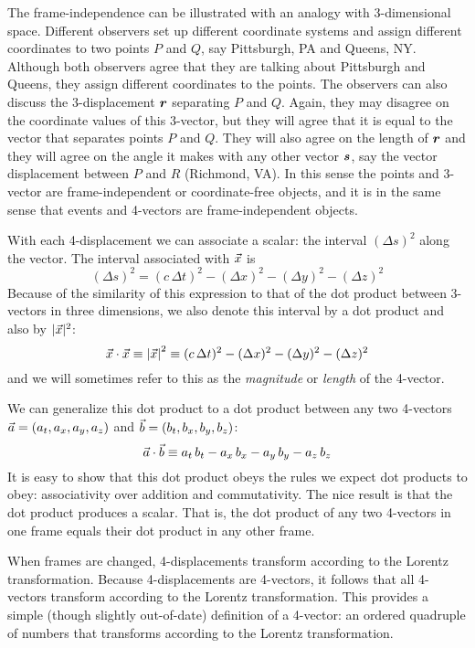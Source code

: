 The frame-independence can be illustrated with an analogy with
3-dimensional space.  Different observers set up different coordinate
systems and assign different coordinates to two points $P$ and $Q$,
say Pittsburgh, PA and Queens, NY.  Although both observers agree that
they are talking about Pittsburgh and Queens, they assign different
coordinates to the points.  The observers can also discuss the
3-displacement $\mbox{\boldmath $r$}$ separating $P$ and $Q$.  Again, they may
disagree on the coordinate values of this 3-vector, but they will
agree that it is equal to the vector that separates points $P$ and
$Q$.  They will also agree on the length of $\mbox{\boldmath $r$}$ and they will
agree on the angle it makes with any other vector $\mbox{\boldmath $s$}$, say the
vector displacement between $P$ and $R$ (Richmond, VA).  In this sense
the points and 3-vector are frame-independent or coordinate-free
objects, and it is in the same sense that events and 4-vectors are
frame-independent objects.

With each 4-displacement we can associate a scalar: the interval
$(\Delta s)^2$ along the vector.  The interval associated with
$\vec{x}$ is
\begin{equation}
(\Delta s)^2 = (c\,\Delta t)^2 - (\Delta x)^2 - (\Delta y)^2 - (\Delta
z)^2
\end{equation}
Because of the similarity of this expression to that of the dot
product between 3-vectors in three dimensions, we also denote this
interval by a dot product and also by $|\vec{x}|^2$:
\begin{equation}
\vec{x}\cdot\vec{x} \equiv \left|\vec{x}\right|^2 \equiv
(c\,\Delta t)^2 - (\Delta x)^2 - (\Delta y)^2 - (\Delta z)^2
\end{equation}
and we will sometimes refer to this as the {\em magnitude\/} or {\em
length\/} of the 4-vector.

We can generalize this dot product to a dot product between any two
4-vectors $\vec{a}=(a_t,a_x,a_y,a_z)$ and $\vec{b}=(b_t,b_x,b_y,b_z)$:
\begin{equation}
\vec{a}\cdot\vec{b} \equiv
a_t\, b_t - a_x\, b_x - a_y\, b_y - a_z\, b_z
\end{equation}
It is easy to show that this dot product obeys the rules we expect dot
products to obey: associativity over addition and commutativity.  The
nice result is that the dot product produces a scalar.  That is, the
dot product of any two 4-vectors in one frame equals their dot product
in any other frame.

When frames are changed, 4-displacements transform according to the
Lorentz transformation.  Because 4-displacements are 4-vectors, it
follows that all 4-vectors transform according to the Lorentz
transformation.  This provides a simple (though slightly out-of-date)
definition of a 4-vector: an ordered quadruple of numbers that
transforms according to the Lorentz transformation.

